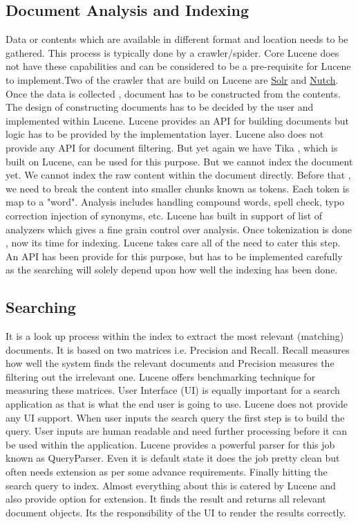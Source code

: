 \documentclass[9pt,twocolumn,twoside]{styles/osajnl}
\begin{document}
\subsection{Document Analysis and Indexing}
Data or contents which are available in different format and location needs to be gathered. This process is typically done by a crawler/spider. Core Lucene does not have these capabilities and can be considered to be a pre-requisite for Lucene to implement.Two of the crawler that are build on Lucene are \href{http://lucene.apache.org/solr}{Solr} and \href{http://lucene.apache.org/nutch}{Nutch}. Once the data is collected , document has to be constructed from the contents. The design of constructing documents has to be decided by the user and implemented within Lucene. Lucene provides an API for building documents but logic has to be provided by the implementation layer. Lucene also does not provide any API for document filtering. But yet again we have Tika , which is built on Lucene, can be used for this purpose. But we cannot index the document yet. We cannot index the raw content within the document directly. Before that , we need to break the content into smaller chunks known as tokens. Each token is map to a "word". Analysis includes handling compound words, spell check, typo correction injection of synonyms, etc. Lucene has built in support of list of analyzers which gives a fine grain control over analysis. Once tokenization is done , now its time for indexing. Lucene takes care all of the need to cater this step. An API has been provide for this purpose, but has to be implemented carefully as the searching will solely depend upon how well the indexing has been done.


\subsection{Searching}
It is a look up process within the index to extract the most relevant (matching) documents. It is based on two matrices i.e. Precision and Recall. Recall measures how well the system finds the relevant documents and Precision measures the filtering out the irrelevant one. Lucene offers benchmarking technique for measuring these matrices. User Interface (UI) is equally important for a search application as that is what the end user is going to use. Lucene does not provide any UI support. When user inputs the search query the first step is to build the query. User inputs are human readable and need further processing before it can be used within the application. Lucene provides a powerful parser for this job known as QueryParser. Even it is default state it does the job pretty clean but often needs extension as per some advance requirements. Finally hitting the search query to index. Almost everything about this is catered by Lucene and also provide option for extension. It finds the result and returns all relevant document objects. Its the responsibility of the UI to render the results correctly.
\end{document}
